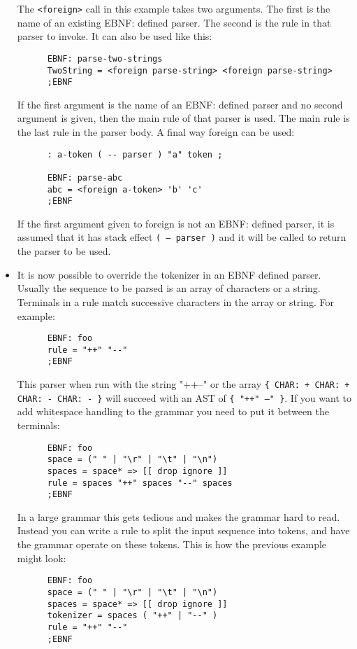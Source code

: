 \begin{itemize}
      The \texttt{<foreign>} call in this example takes two arguments. The
      first is the name of an existing EBNF: defined parser. The
      second is the rule in that parser to invoke. It can also be used
      like this:
\begin{verbatim}
      EBNF: parse-two-strings
      TwoString = <foreign parse-string> <foreign parse-string>
      ;EBNF
\end{verbatim}

      If the first argument is the name of an EBNF: defined parser and
      no second argument is given, then the main rule of that parser
      is used. The main rule is the last rule in the parser body. A
      final way foreign can be used:
\begin{verbatim}
      : a-token ( -- parser ) "a" token ;

      EBNF: parse-abc
      abc = <foreign a-token> 'b' 'c'
      ;EBNF
\end{verbatim}

      If the first argument given to foreign is not an EBNF: defined
      parser, it is assumed that it has stack effect \texttt{( -- parser )} and
      it will be called to return the parser to be used.

\item It is now possible to override the tokenizer in an EBNF defined
  parser. Usually the sequence to be parsed is an array of characters
  or a string. Terminals in a rule match successive characters in the
  array or string. For example:
\begin{verbatim}
      EBNF: foo
      rule = "++" "--"
      ;EBNF
\end{verbatim}

      This parser when run with the string "++--" or the array 
      \texttt{\{ CHAR: + CHAR: + CHAR: - CHAR: - \}} will succeed with an AST of 
      \texttt{\{ "++"  --" \}}. If you want to add whitespace handling to the grammar
      you need to put it between the terminals:
\begin{verbatim}
      EBNF: foo
      space = (" " | "\r" | "\t" | "\n")
      spaces = space* => [[ drop ignore ]]
      rule = spaces "++" spaces "--" spaces
      ;EBNF
\end{verbatim}

      In a large grammar this gets tedious and makes the grammar hard
      to read. Instead you can write a rule to split the input
      sequence into tokens, and have the grammar operate on these
      tokens. This is how the previous example might look:
\begin{verbatim}
      EBNF: foo
      space = (" " | "\r" | "\t" | "\n")
      spaces = space* => [[ drop ignore ]]
      tokenizer = spaces ( "++" | "--" )
      rule = "++" "--"
      ;EBNF
\end{verbatim}


\end{itemize}
